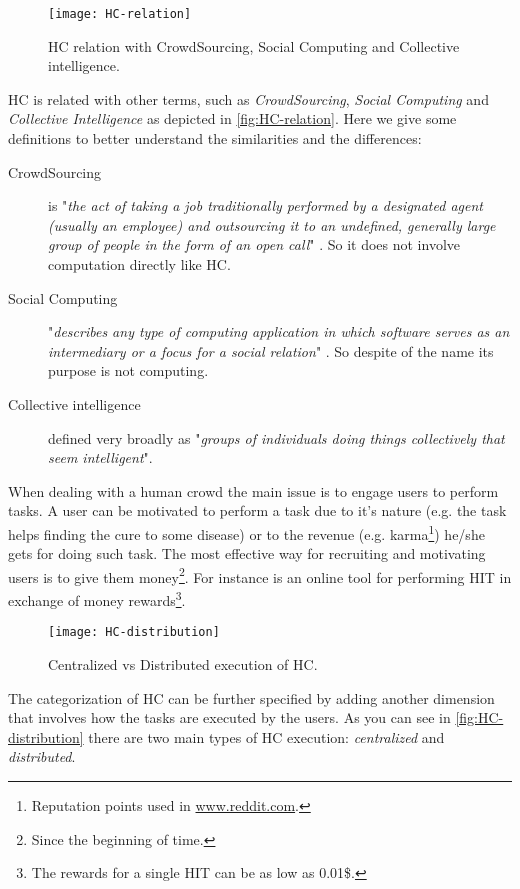 \begin{figure}[htb]
    \centering
    \texttt{[image: HC-relation]}
    \caption{\acl{HC} relation with CrowdSourcing, Social Computing and Collective
    intelligence.}
    \label{fig:HC-relation}
\end{figure}
\acl{HC} is related with other terms, such as \emph{CrowdSourcing},
\emph{Social Computing} and \emph{Collective Intelligence} as depicted in
\autoref{fig:HC-relation}. Here we give some definitions to better understand the
similarities and the differences:
\begin{description}
    \item[CrowdSourcing] is "\emph{the act of taking a job traditionally
    performed by a designated agent (usually an employee) and outsourcing it to an
    undefined, generally large group of people in the form of an open call}"
    \cite{howe2006rise}. So it does not involve computation directly like \ac{HC}.

    \item[Social Computing] "\emph{describes any type of computing application
    in which software serves as an intermediary or a focus for a social relation}"
    \cite{schuler1994social}. So despite of the name its purpose is not computing.

    \item[Collective intelligence] defined very broadly as "\emph{groups of
    individuals doing things collectively that seem intelligent}".
\end{description}

When dealing with a human crowd the main issue is to engage users to perform tasks.
A user can be motivated to perform a task due to it's nature
(e.g. the task helps finding the cure to some disease) or to the revenue (e.g.
karma\footnote{Reputation points used in \url{www.reddit.com}.}) he/she gets for doing
such task. The most effective way for recruiting and motivating users is to give
them money\footnote{Since the beginning of time.}. For instance
 is an online tool for performing \ac{HIT} in exchange of money
rewards\footnote{The rewards for a single \ac{HIT} can be as low as 0.01\$.}.\\

\begin{figure}[htb]
    \centering
    \texttt{[image: HC-distribution]}
    \caption{Centralized vs Distributed execution of \acl{HC}.}
    \label{fig:HC-distribution}
\end{figure}
The categorization of \ac{HC} can be further specified by adding another dimension
that involves how the tasks are executed by the users. As you can see in
\autoref{fig:HC-distribution} there are two main types of \ac{HC} execution:
\emph{centralized} and \emph{distributed}.







